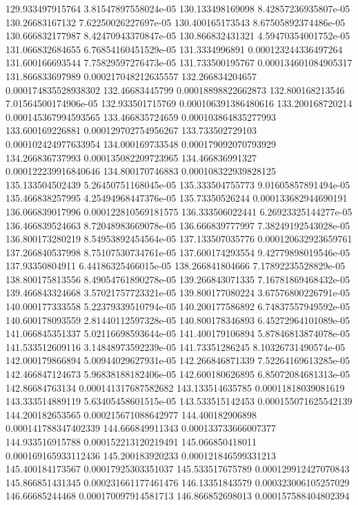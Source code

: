 {129.933497915764 3.81547897558024e-05
130.133498169098 8.42857236935807e-05
130.26683167132 7.62250026227697e-05
130.400165173543 8.67505892374486e-05
130.666832177987 8.42470943370847e-05
130.866832431321 4.59470354001752e-05
131.066832684655 6.76854160451529e-05
131.3334996891 0.000123244336497264
131.600166693544 7.75829597276473e-05
131.733500195767 0.000134601084905317
131.866833697989 0.000217048212635557
132.266834204657 0.000174835528938302
132.46683445799 0.00018898822662873
132.800168213546 7.01564500174906e-05
132.933501715769 0.000106391386480616
133.200168720214 0.000145367994593565
133.466835724659 0.000103864835277993
133.600169226881 0.000129702754956267
133.733502729103 0.000102424977633954
134.000169733548 0.000179092070793929
134.266836737993 0.000135082209723965
134.466836991327 0.000122239916840646
134.800170746883 0.000108322939828125
135.133504502439 5.26450751168045e-05
135.333504755773 9.01605857891494e-05
135.466838257995 4.25494968447376e-05
135.73350526244 0.000133682944690191
136.066839017996 0.000122810569181575
136.333506022441 6.26923325144277e-05
136.466839524663 8.72048983669078e-05
136.666839777997 7.38249192543028e-05
136.800173280219 8.54953892454564e-05
137.133507035776 0.000120632923659761
137.266840537998 8.75107530734761e-05
137.600174293554 9.42779898019546e-05
137.93350804911 6.44186325466015e-05
138.266841804666 7.17892235528829e-05
138.800175813556 8.49054761890278e-05
139.266843071335 7.16781869468432e-05
139.466843324668 3.57021757723321e-05
139.800177080224 3.67576800226791e-05
140.000177333558 5.22379339510794e-05
140.200177586892 6.74837557949592e-05
140.600178093559 2.81440112597328e-05
140.800178346893 6.45272964101089e-05
141.066845351337 5.02116698593644e-05
141.400179106894 5.87846813874078e-05
141.533512609116 3.14848973592239e-05
141.73351286245 8.10326731490574e-05
142.000179866894 5.00944029627931e-05
142.266846871339 7.52264169613285e-05
142.466847124673 5.96838188182406e-05
142.600180626895 6.85072084681313e-05
142.86684763134 0.000141317687582682
143.133514635785 0.00011818039081619
143.333514889119 5.63405458601515e-05
143.533515142453 0.000155071625542139
144.200182653565 0.000215671088642977
144.400182906898 0.000141788347402339
144.666849911343 0.000133733666007377
144.933516915788 0.000152213120219491
145.066850418011 0.000169165933112436
145.200183920233 0.000121846599331213
145.400184173567 0.00017925303351037
145.533517675789 0.000129912427070843
145.866851431345 0.000231661177461476
146.13351843579 0.000323006105257029
146.66685244468 0.000170097914581713
146.866852698013 0.000157588404802394
}
